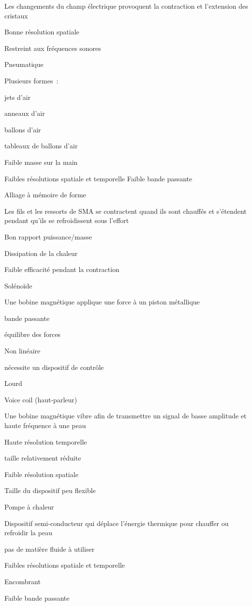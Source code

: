 \documentclass[
]{book}
\begin{document}
Les changements du champ électrique
provoquent la contraction et l'extension des cristaux

Bonne résolution spatiale

Restreint aux fréquences sonores

Pneumatique

Plusieurs formes~:

jets d'air

anneaux d'air

ballons d'air

tableaux de ballons d'air

Faible masse sur la main

Faibles résolutions spatiale et
temporelle Faible bande passante

Alliage à mémoire de forme

Les fils et les ressorts de SMA se
contractent quand ils sont chauffés et s'étendent pendant qu'ils se
refroidissent sous l'effort

Bon rapport puissance/masse

Dissipation de la chaleur

Faible efficacité pendant la
contraction

Solénoïde

Une bobine magnétique applique une
force à un piston métallique

bande passante

équilibre des forces

Non linéaire

nécessite un dispositif de contrôle

Lourd

Voice coil (haut-parleur)

Une bobine magnétique vibre afin de
transmettre un signal de basse amplitude et haute fréquence à une
peau

Haute résolution temporelle

taille relativement réduite

Faible résolution spatiale

Taille du dispositif peu flexible

Pompe à chaleur

Dispositif semi-conducteur qui déplace
l'énergie thermique pour chauffer ou refroidir la peau

pas de matière fluide à utiliser

Faibles résolutions spatiale et
temporelle

Encombrant

Faible bande passante
\end{document}
